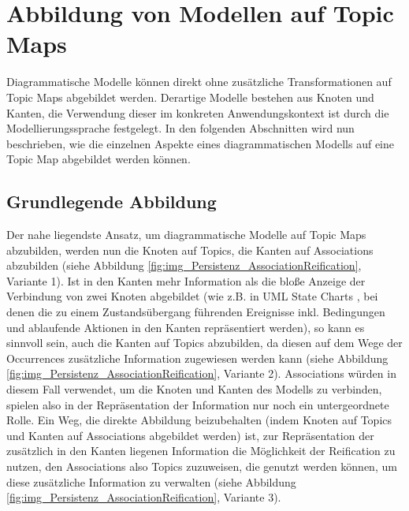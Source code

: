 
\section{Abbildung von Modellen auf Topic Maps} %
\label{sec:abbildung_von_modellen_auf_topic_maps}

Diagrammatische Modelle \citep{Oppl05a} können direkt ohne zusätzliche Transformationen auf Topic Maps abgebildet werden. Derartige Modelle bestehen aus Knoten und Kanten, die Verwendung dieser im konkreten Anwendungskontext ist durch die Modellierungssprache festgelegt. In den folgenden Abschnitten wird nun beschrieben, wie die einzelnen Aspekte eines diagrammatischen Modells auf eine Topic Map abgebildet werden können.

\subsection{Grundlegende Abbildung} %
\label{sub:grundlegende_abbildung}
Der nahe liegendste Ansatz, um diagrammatische Modelle auf Topic Maps abzubilden, werden nun die Knoten auf Topics, die Kanten auf Associations abzubilden (siehe Abbildung \ref{fig:img_Persistenz_AssociationReification}, Variante 1). Ist in den Kanten mehr Information als die bloße Anzeige der Verbindung von zwei Knoten abgebildet (wie z.B. in UML State Charts \citep{Rumbaugh04}, bei denen die zu einem Zustandsübergang führenden Ereignisse inkl. Bedingungen und ablaufende Aktionen in den Kanten repräsentiert werden), so kann es sinnvoll sein, auch die Kanten auf Topics abzubilden, da diesen auf dem Wege der Occurrences zusätzliche Information zugewiesen werden kann (siehe Abbildung \ref{fig:img_Persistenz_AssociationReification}, Variante 2). Associations würden in diesem Fall verwendet, um die Knoten und Kanten des Modells zu verbinden, spielen also in der Repräsentation der Information nur noch ein untergeordnete Rolle. Ein Weg, die direkte Abbildung beizubehalten (indem Knoten auf Topics und Kanten auf Associations abgebildet werden) ist, zur Repräsentation der zusätzlich in den Kanten liegenen Information die Möglichkeit der Reification zu nutzen, den Associations also Topics zuzuweisen, die genutzt werden können, um diese zusätzliche Information zu verwalten (siehe Abbildung \ref{fig:img_Persistenz_AssociationReification}, Variante 3).

